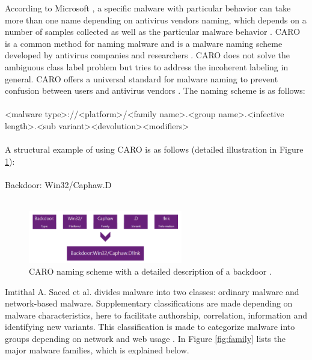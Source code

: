 \documentclass[12pt]{article} %
\begin{document}
According to Microsoft \cite{kosmidis2017machine}, a specific malware with particular behavior can take more than one name depending on antivirus vendors naming, which depends on a number of samples collected as well as the particular malware behavior \cite{kosmidis2017machine}. CARO is a common method for naming malware and is a malware naming scheme developed by antivirus companies and researchers \cite{kosmidis2017machine}. CARO does not solve the ambiguous class label problem but tries to address the incoherent labeling in general. CARO offers a universal standard for malware naming to prevent confusion between users and antivirus vendors \cite{kosmidis2017machine}. The naming scheme is as follows: \\ \\
<malware type>://<platform>/<family name>.<group name>.<infective length>.<sub variant><devolution><modifiers>
\\ \\
A structural example of using CARO is as follows (detailed illustration in Figure \ref{fig:malwarenaming}):
\\ \\
Backdoor: Win32/Caphaw.D
\\ \\
\begin{figure}[H]
    \centering
    \includegraphics[width=0.6\textwidth]{malwarenaming}
    \captionsetup{width=0.8\textwidth}
    \caption{CARO naming scheme with a detailed description of a backdoor \cite{kosmidis2017machine}.}
    \label{fig:malwarenaming}
\end{figure}

Imtithal A. Saeed et al. \cite{Asurveyonmalware} divides malware into two classes: ordinary malware and network-based malware. Supplementary classifications are made depending on malware characteristics, here to facilitate authorship, correlation, information and identifying new variants. This classification is made to categorize malware into groups depending on network and web usage \cite{Asurveyonmalware}. In Figure \ref{fig:family} lists the major malware families, which is explained below.
\end{document}
